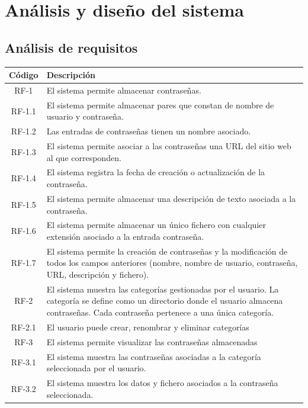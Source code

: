 \documentclass{article}
\begin{document}
\section{Análisis y diseño del sistema}
 
\subsection{Análisis de requisitos}
 
\begin{table}[H]
   \centering
   \begin{tabular}{| c | p{30em} |}
   \hline
       Código &  Descripción  \\ \hline
       RF-1 & El sistema permite almacenar contraseñas. \\ \hline
       RF-1.1 & El sistema permite almacenar pares que constan de nombre de usuario y contraseña.  \\ \hline
       RF-1.2 & Las entradas de contraseñas tienen un nombre asociado. \\ \hline
       RF-1.3 & El sistema permite asociar a las contraseñas una URL del sitio web al que corresponden. \\ \hline
       RF-1.4 & El sistema registra la fecha de creación o actualización de la contraseña. \\ \hline
       RF-1.5 & El sistema permite almacenar una descripción de texto asociada a la contraseña. \\ \hline
       RF-1.6 & El sistema permite almacenar un único fichero con cualquier extensión asociado a la entrada contraseña. \\ \hline
       RF-1.7 & El sistema permite la creación de contraseñas y la modificación de todos los campos anteriores (nombre, nombre de usuario, contraseña, URL, descripción y fichero). \\ \hline
       RF-2 & El sistema muestra las categorías gestionadas por el usuario. La categoría se define como un directorio donde el usuario almacena contraseñas. Cada contraseña pertenece a una única categoría.\\ \hline
       RF-2.1 & El usuario puede crear, renombrar y eliminar categorías \\ \hline
       RF-3 & El sistema permite visualizar las contraseñas almacenadas\\ \hline
       RF-3.1 & El sistema muestra las contraseñas asociadas a la categoría seleccionada por el usuario. \\ \hline
       RF-3.2 & El sistema muestra los datos y fichero asociados a la contraseña seleccionada. \\ \hline

\end{tabular}
\end{table}
\end{document}
